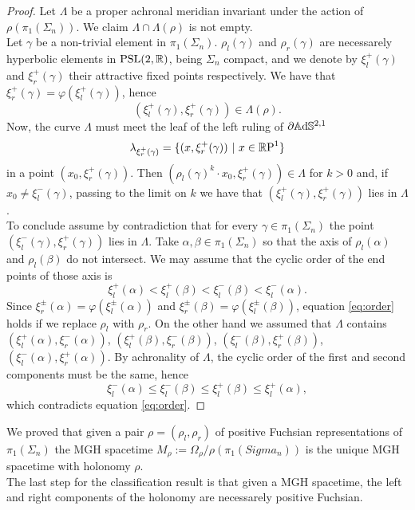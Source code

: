 \begin{proof} 
    Let $\Lambda$ be a proper achronal meridian invariant under the action of $\rho(\pi_1(\Sigma_n))$. We claim $\Lambda \cap \Lambda(\rho)$ is not empty.\\
    Let $\gamma$ be a non-trivial element in $\pi_1(\Sigma_n)$. $\rho_l(\gamma)$ and $\rho_r(\gamma)$ are necessarely hyperbolic elements in $\PSL$, being $\Sigma_n$ compact, and we denote by $\xi^+_l(\gamma)$ and $\xi^+_r(\gamma)$ their attractive fixed points respectively. We have that $\xi^+_r(\gamma) = \varphi(\xi^+_l(\gamma))$, hence
    \[
        (\xi^+_l(\gamma), \xi^+_r(\gamma)) \in \Lambda(\rho).
    \]
    Now, the curve $\Lambda$ must meet the leaf of the left ruling of $\partial \A^{2,1}$
    \[
        \lambda_{\xi^+_r(\gamma)} = \{ (x, \xi^+_r(\gamma)) \ | \ x\in \S \}
    \]
    in a point $(x_0, \xi^+_r(\gamma))$. Then $(\rho_l(\gamma)^k \cdot x_0 ,\xi^+_r(\gamma)) \in \Lambda$ for $k>0$ and, if $x_0\neq \xi^-_l(\gamma)$, passing to the limit on $k$ we have that $(\xi^+_l(\gamma),\xi^+_r(\gamma))$ lies in $\Lambda$.\\
    To conclude assume by contradiction that for every $\gamma \in \pi_1(\Sigma_n)$ the point $(\xi^-_l(\gamma),\xi^+_r(\gamma))$ lies in $\Lambda$. Take $\alpha , \beta \in \pi_1(\Sigma_n)$ so that the axis of $\rho_l(\alpha)$ and $\rho_l(\beta)$ do not intersect. We may assume that the cyclic order of the end points of those axis is
    \begin{equation}\label{eq:order}
        \xi^+_l(\alpha) < \xi^+_l(\beta) < \xi^-_l(\beta) < \xi^-_l(\alpha).
    \end{equation}
    Since $\xi^\pm_r(\alpha) = \varphi(\xi^\pm_l(\alpha))$ and $\xi^\pm_r(\beta) = \varphi(\xi^\pm_l(\beta))$, equation \ref{eq:order} holds if we replace $\rho_l$ with $\rho_r$.
    On the other hand we assumed that $\Lambda$ contains $(\xi^+_l(\alpha), \xi^-_r(\alpha))$, $(\xi^+_l(\beta), \xi^-_r(\beta))$, $(\xi^-_l(\beta), \xi^+_r(\beta))$, $(\xi^-_l(\alpha), \xi^+_r(\alpha))$. By achronality of $\Lambda$, the cyclic order of the first and second components must be the same, hence
    \[
        \xi^-_l(\alpha) \leq \xi^-_l(\beta) \leq \xi^+_l(\beta) \leq \xi^+_l(\alpha),
    \]
    which contradicts equation \ref{eq:order}.
\end{proof}
We proved that given a pair $\rho = (\rho_l,\rho_r)$ of positive Fuchsian representations of $\pi_1(\Sigma_n)$ the MGH spacetime $M_\rho := \Omega_\rho / \rho(\pi_1(Sigma_n))$ is the unique MGH spacetime with holonomy $\rho$.\\
The last step for the classification result is that given a MGH spacetime, the left and right components of the holonomy are necessarely positive Fuchsian.

